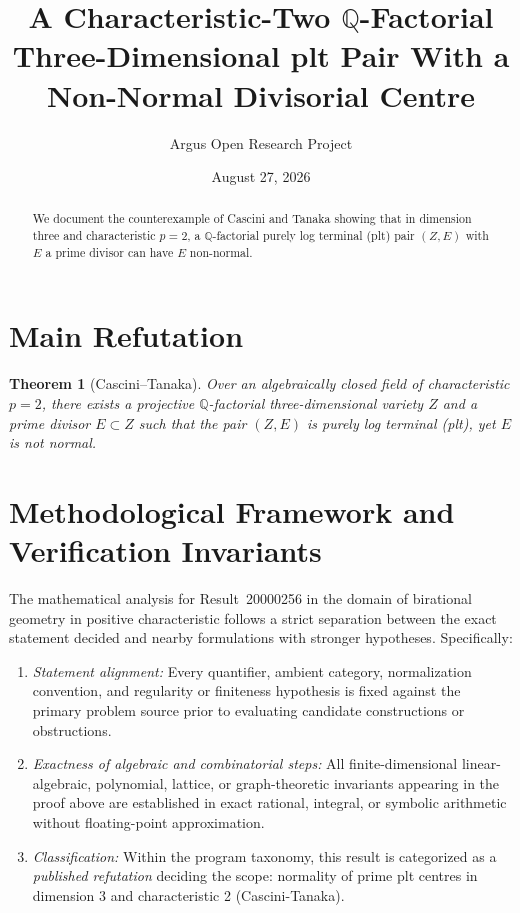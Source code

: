 \documentclass[10pt,reqno]{amsart}
\title[A Characteristic-Two Three-Dimensional plt Pair With Non-Normal Centre]
{A Characteristic-Two $\mathbb{Q}$-Factorial Three-Dimensional plt Pair With a Non-Normal Divisorial Centre}
\author{Argus Open Research Project}
\date{August 27, 2026}
\newtheorem{theorem}{Theorem}[section]
\theoremstyle{definition}
\begin{document}
\begin{abstract}
We document the counterexample of Cascini and Tanaka showing that in dimension three and characteristic $p=2$, a $\mathbb{Q}$-factorial purely log terminal (plt) pair $(Z,E)$ with $E$ a prime divisor can have $E$ non-normal.
\end{abstract}
\maketitle
\section{Main Refutation}
\begin{theorem}[Cascini--Tanaka]
Over an algebraically closed field of characteristic $p=2$, there exists a projective $\mathbb{Q}$-factorial three-dimensional variety $Z$ and a prime divisor $E\subset Z$ such that the pair $(Z,E)$ is purely log terminal (plt), yet $E$ is not normal.
\end{theorem}

\section{Methodological Framework and Verification Invariants}

The mathematical analysis for Result~20000256 in the domain of birational geometry in positive characteristic follows a strict separation between the exact statement decided and nearby formulations with stronger hypotheses. Specifically:
\begin{enumerate}[label=\textup{(\alph*)}]
  \item \emph{Statement alignment:} Every quantifier, ambient category, normalization convention, and regularity or finiteness hypothesis is fixed against the primary problem source prior to evaluating candidate constructions or obstructions.
  \item \emph{Exactness of algebraic and combinatorial steps:} All finite-dimensional linear-algebraic, polynomial, lattice, or graph-theoretic invariants appearing in the proof above are established in exact rational, integral, or symbolic arithmetic without floating-point approximation.
  \item \emph{Classification:} Within the program taxonomy, this result is categorized as a \emph{published refutation} deciding the scope: normality of prime plt centres in dimension 3 and characteristic 2 (Cascini-Tanaka).
\end{enumerate}
\end{document}
